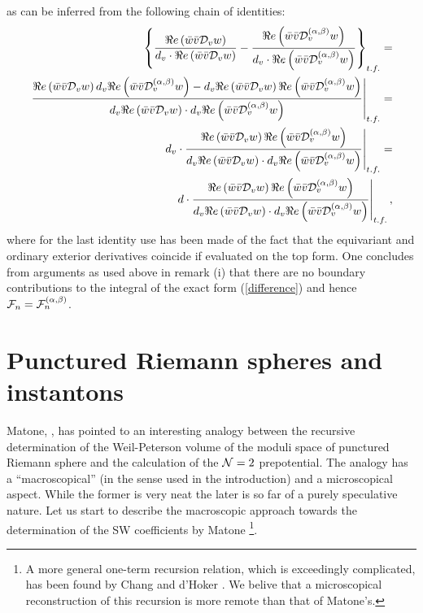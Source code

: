 \documentclass[a4paper,12pt]{article}
\begin{document}
as can be inferred from the following chain of identities:  
\begin{eqnarray}
\left\{
\frac{ \Re e \left(\bar{w}\bar{v}
{\cal D}_v w\right)}{d_v \cdot  \Re e\left(\bar{w}\bar{v}
{\cal D}_v w\right)}-\frac{\Re e \left(\bar{w}\bar{v}
{\cal D}_v^{(\alpha, \beta)}w\right)}{d_v \cdot  \Re e 
\left(\bar{w}\bar{v}{\cal D}_v^{(\alpha, \beta)}w\right)}
\right\}_{t.f.}= \nonumber \\
\left. 
\frac{
\Re e \left(\bar{w}\bar{v}
{\cal D}_v w\right) d_v \Re e 
\left(\bar{w}\bar{v}{\cal D}_v^{(\alpha, \beta)}w\right)- 
d_v \Re e\left(\bar{w}\bar{v}
{\cal D}_v w\right) \Re e \left(\bar{w}\bar{v}
{\cal D}_v^{(\alpha, \beta)}w\right)}
{d_v \Re e\left(\bar{w}\bar{v}
{\cal D}_v w\right) \cdot d_v \Re e 
\left(\bar{w}\bar{v}{\cal D}_v^{(\alpha, \beta)}w\right)}  
\right|_{t.f.}= \nonumber \\
\left. d_v \cdot 
\frac{\Re e \left(\bar{w}\bar{v}
{\cal D}_v w\right) \Re e 
\left(\bar{w}\bar{v}{\cal D}_v^{(\alpha, \beta)}w\right)}
{d_v \Re e\left(\bar{w}\bar{v}
{\cal D}_v w\right) \cdot d_v \Re e 
\left(\bar{w}\bar{v}{\cal D}_v^{(\alpha, \beta)}w\right)}
\right|_{t.f.} = \nonumber \\
\left. d \cdot 
\frac{\Re e \left(\bar{w}\bar{v}
{\cal D}_v w\right) \Re e 
\left(\bar{w}\bar{v}{\cal D}_v^{(\alpha, \beta)}w\right)}
{d_v \Re e\left(\bar{w}\bar{v}
{\cal D}_v w\right) \cdot d_v \Re e 
\left(\bar{w}\bar{v}{\cal D}_v^{(\alpha, \beta)}w\right)}
\right|_{t.f.},
\label{difference}
\end{eqnarray}
where for the last identity use has been made of the fact that the 
equivariant and ordinary exterior derivatives coincide if evaluated 
on the top form.
One concludes from arguments as used above in remark (i) that there 
are no boundary contributions to the integral of the exact form 
(\ref{difference}) and hence ${\cal F}_n ={\cal F}_n^{(\alpha, \beta)}$.

\section{Punctured Riemann spheres and instantons}\label{sec:V}

Matone, \cite{matone3}, has pointed to an interesting analogy between 
the recursive determination of the Weil-Peterson volume of the 
moduli space of punctured Riemann sphere and the calculation of 
the ${\cal N}=2$ prepotential. The analogy has a ``macroscopical'' 
(in the sense used in the introduction) and a microscopical aspect. 
While the former is very neat the later is so far of a purely 
speculative nature. Let us start to describe the macroscopic approach 
towards the determination of the SW coefficients by Matone 
\cite{matone3} \footnote{
A more general one-term recursion relation, which 
is exceedingly complicated, has been found by Chang and d'Hoker 
\cite{chan}. We belive that a microscopical reconstruction 
of this recursion is more remote than that of Matone's. 
}.
\end{document}
